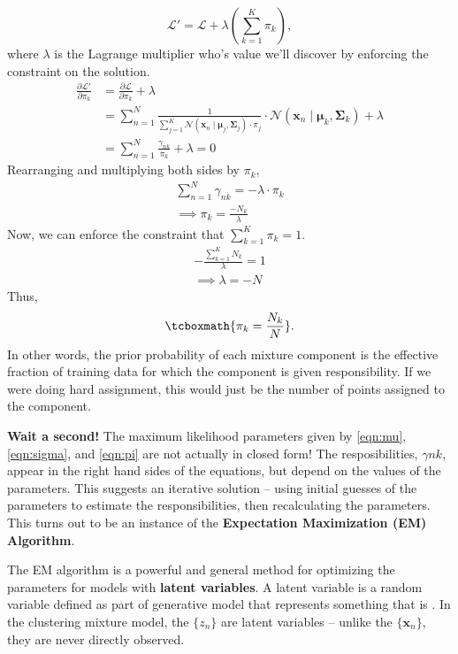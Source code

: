 \documentclass[11pt]{article}
\newcommand{\xb}{\mathbf{x}}
\newcommand{\ub}{\symbf{\mu}}
\newcommand{\Sb}{\symbf{\Sigma}}
\begin{document}
\begin{equation*}
  \mathcal{L}'  = \mathcal{L} + \lambda
    \left( \sum_{k=1}^K \pi_k\right),
\end{equation*}
where $\lambda$ is the Lagrange multiplier who's value we'll discover by
enforcing the constraint on the solution.
\begin{align*}
  \frac{\partial \mathcal{L}'}{\partial \pi_k}
      &= \frac{\partial \mathcal{L}}{\partial \pi_k} + \lambda \\
  &= \sum_{n=1}^N
    \frac{1}{\sum_{j=1}^K \mathcal{N}(\xb_n \mid \ub_j, \Sb_j) \cdot \pi_j}
    \cdot \mathcal{N}(\xb_n \mid \ub_k, \Sb_k) + \lambda \\
    &= \sum_{n=1}^N \frac{\gamma_{nk}}{\pi_k} + \lambda = 0
\end{align*}
Rearranging and multiplying both sides by $\pi_k$,
\begin{gather*}
    \sum_{n=1}^N \gamma_{nk} = - \lambda \cdot \pi_k \\
    \implies \pi_k = \frac{-N_k}{\lambda}
\end{gather*}
Now, we can enforce the constraint that $\sum_{k=1}^K \pi_k = 1$.
\begin{gather*}
    -\frac{\sum_{k=1}^K N_k}{\lambda} = 1 \\
    \implies \lambda = -N
\end{gather*}
Thus,
\begin{equation}
  \tcboxmath{\pi_k = \frac{N_k}{N}}.
  \label{eqn:pi}
\end{equation}
In other words, the prior probability of each mixture component is the effective
fraction of training data for which the component is given responsibility. If
we were doing hard assignment, this would just be the number of points assigned
to the component.

\textbf{Wait a second!} The maximum likelihood parameters given by
\eqref{eqn:mu}, \eqref{eqn:sigma}, and \eqref{eqn:pi} are not actually in
closed form! The resposibilities, $\gamma{nk}$, appear in the right hand sides
of the equations, but depend on the values of the parameters. This suggests an
iterative solution -- using initial guesses of the parameters to estimate the
responsibilities, then recalculating the parameters. This turns out to be an
instance of the \textbf{Expectation Maximization (EM) Algorithm}.

The EM algorithm is a powerful and general method for optimizing the parameters
for models with \textbf{latent variables}. A latent variable is a random
variable defined as part of generative model that represents something that is
. In the clustering mixture model, the $\{z_n\}$ are
latent variables -- unlike the $\{\xb_n\}$, they are never directly observed.
\end{document}

